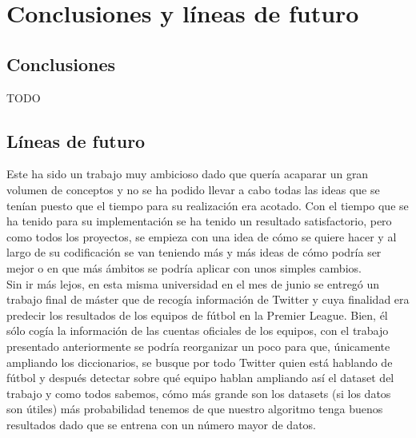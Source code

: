 \documentclass[../all.tex]{subfiles}
\begin{document}
\section{Conclusiones y líneas de futuro} 
\subsection{Conclusiones} %

{\color{red} 
	TODO\\
}
\newpage



\subsection{Líneas de futuro} 
	
	
	Este ha sido un trabajo muy ambicioso dado que quería acaparar un gran volumen de conceptos y no se ha podido llevar a cabo todas las ideas que se tenían puesto que el tiempo para su realización era acotado. Con el tiempo que se ha tenido para su implementación se ha tenido un resultado satisfactorio, pero como todos los proyectos, se empieza con una idea de cómo se quiere hacer y al largo de su codificación se van teniendo más y más ideas de cómo podría ser mejor o en que más ámbitos se podría aplicar con unos simples cambios.\\
	
	Sin ir más lejos, en esta misma universidad en el mes de junio se entregó un trabajo final de máster que de recogía información de Twitter y cuya finalidad era predecir los resultados de los equipos de fútbol en la Premier League. Bien, él sólo cogía la información de las cuentas oficiales de los equipos,  con el trabajo presentado anteriormente se podría reorganizar un poco para que, únicamente ampliando los diccionarios, se busque por todo Twitter quien está hablando de fútbol y después detectar sobre qué equipo hablan ampliando así el dataset del trabajo y como todos sabemos, cómo más grande son los datasets (si los datos son útiles) más probabilidad tenemos de que nuestro algoritmo tenga buenos resultados dado que se entrena con un número mayor de datos.\\
	
\end{document}
